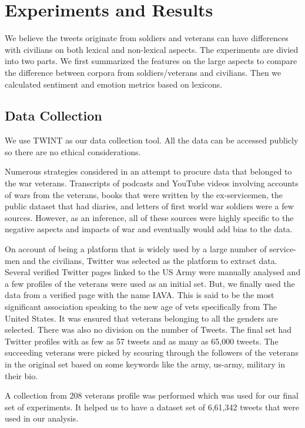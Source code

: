 \section{Experiments and Results}

We believe the tweets originate from soldiers and veterans can have differences with civilians on both lexical and non-lexical aspects. The experiments are divied into two parts. We first summarized the features on the large aspects to compare the difference between corpora from soldiers/veterans and civilians. Then we calculated sentiment and emotion metrics based on lexicons.

\subsection{Data Collection}

We use TWINT \citep{twint} as our data collection tool. All the data can be accessed publicly so there are no ethical considerations.

Numerous strategies considered in an attempt to procure data that belonged to the war veterans. Transcripts of podcasts and YouTube videos involving accounts of wars from the veterans, books that were written by the ex-servicemen, the public dataset that had diaries, and letters of first world war soldiers were a few sources. However, as an inference, all of these sources were highly specific to the negative aspects and impacts of war and eventually would add bias to the data.

On account of being a platform that is widely used by a large number of service-men and the civilians, Twitter was selected as the platform to extract data. Several verified Twitter pages linked to the US Army were manually analysed and a few profiles of the veterans were used as an initial set. But, we finally used the data from a verified page with the name IAVA. This is said to be the most significant association speaking to the new age of vets specifically from The United States. It was ensured that veterans belonging to all the genders are selected. There was also no division on the number of Tweets. The final set had Twitter profiles with as few as 57 tweets and as many as 65,000 tweets. The succeeding veterans were picked by scouring through the followers of the veterans in the original set based on some keywords like the army, us-army, military in their bio.

A collection from 208 veterans profile was performed which was used for our final set of experiments. It helped us to have a dataset set of 6,61,342 tweets that were used in our analysis.

